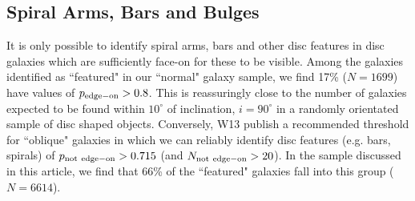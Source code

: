 \documentclass[usenatbib]{mn2e}
\newcommand{\comment}[2][todo]{{\color{#1}[[{\bf #2}]]}}
\begin{document}


\subsection{Spiral Arms, Bars and Bulges}
 
  It is only possible to identify spiral arms, bars and other disc features in disc galaxies which are sufficiently face-on for these to be visible.  Among the galaxies identified as ``featured" in our ``normal" galaxy sample, we find {17\% ($N=1 699$)} have values of $p_{\rm edge-on}>0.8$. This is reassuringly close to the number of galaxies expected to be found within $10^\circ$ of inclination, $i=90^\circ$ in a randomly orientated sample of disc shaped objects. %
Conversely, W13 publish a recommended threshold for ``oblique" galaxies in which we can reliably identify disc features (e.g. bars, spirals) of $p_{\rm not~edge-on}>0.715$ (and $N_{\rm not~edge-on}>20$). In the sample discussed in this article, we find that {66}\% of the ``featured" galaxies fall into this group {($N=6 614$)}. 
 
\end{document}
